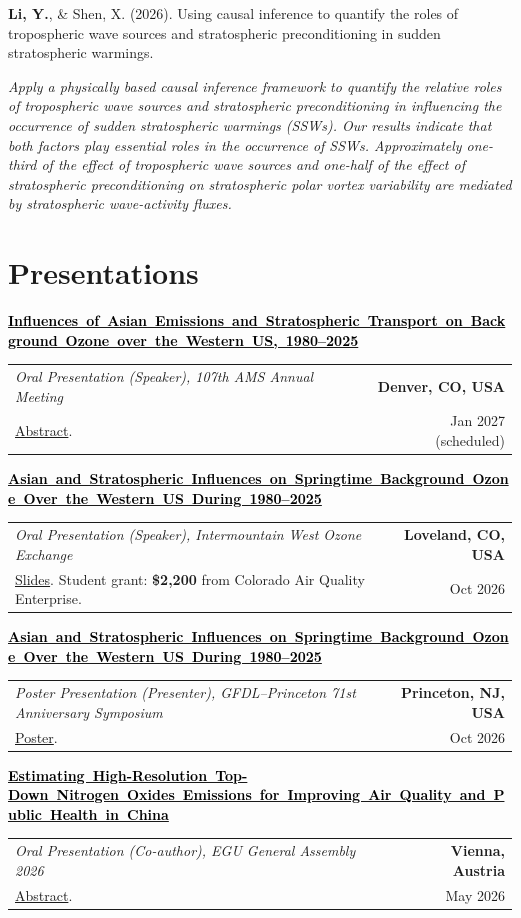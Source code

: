 \documentclass[11pt,a4paper]{article}
\makeatletter
\newcommand{\publication}[1]{%
  \Needspace{4\baselineskip}
  \par\noindent #1\par
}
\newcommand{\prestitle}[1]{\mbox{\fontsize{9.3}{11.5}\selectfont\textbf{#1}}}
\newcommand{\presentation}[5]{%
  \Needspace{4\baselineskip}
  \par\noindent\makebox[1.1em][l]{\textbullet}%
  \parbox[t]{\dimexpr\linewidth-1.1em\relax}{%
    \prestitle{#1}\par\vspace{1pt}%
    \begin{tabularx}{\linewidth}{@{}>{\raggedright\arraybackslash}X r@{}}
      \textit{#2} & \textbf{#3} \\
      #5 & #4
    \end{tabularx}}\par\vspace{3pt}
}
\newcommand{\researchsummary}[1]{%
  {\itshape #1\par}\vspace{4pt}
}
\makeatother
\begin{document}
\publication{\textbf{Li, Y.}, \& Shen, X. (2026). Using causal inference to quantify the roles of tropospheric wave sources and stratospheric preconditioning in sudden stratospheric warmings.}

\researchsummary{Apply a physically based causal inference framework to quantify the relative roles of tropospheric wave sources and stratospheric preconditioning in influencing the occurrence of sudden stratospheric warmings (SSWs). Our results indicate that both factors play essential roles in the occurrence of SSWs. Approximately one-third of the effect of tropospheric wave sources and one-half of the effect of stratospheric preconditioning on stratospheric polar vortex variability are mediated by stratospheric wave-activity fluxes.}

\section*{Presentations}

\presentation{\href{https://ams.confex.com/ams/107ANNUAL/meetingapp.cgi/Paper/487187}{\textcolor{black}{Influences of Asian Emissions and Stratospheric Transport on Background Ozone over the Western US, \mbox{1980--2025}}}}
  {Oral Presentation (Speaker), 107th AMS Annual Meeting}
  {Denver, CO, USA}
  {Jan 2027 (scheduled)}
  {\href{https://ams.confex.com/ams/107ANNUAL/meetingapp.cgi/Paper/487187}{Abstract}.}

\presentation{\href{https://ozoneexchange.org/conference-details/program/}{\textcolor{black}{Asian and Stratospheric Influences on Springtime Background Ozone Over the Western US During \mbox{1980--2025}}}}
  {Oral Presentation (Speaker), Intermountain West Ozone Exchange}
  {Loveland, CO, USA}
  {Oct 2026}
  {\href{https://ozoneexchange.org/wp-content/uploads/2026/10/S8.5-IMW_Ozone_Exchange_Session8_Yifan_Li_PU-1.pdf}{Slides}. Student grant: \textbf{\$2,200} from Colorado Air Quality Enterprise.}

\presentation{\href{https://www.gfdl.noaa.gov/gfdl-princeton-71st-anniversary-symposium/}{\textcolor{black}{Asian and Stratospheric Influences on Springtime Background Ozone Over the Western US During \mbox{1980--2025}}}}
  {Poster Presentation (Presenter), GFDL--Princeton 71st Anniversary Symposium}
  {Princeton, NJ, USA}
  {Oct 2026}
  {\href{https://yifanli24.github.io/assets/pdf/yifan-li-gfdl-princeton-2026-poster.pdf}{Poster}.}

\presentation{\href{https://meetingorganizer.copernicus.org/EGU26/EGU26-1055.html}{\textcolor{black}{Estimating High-Resolution Top-Down Nitrogen Oxides Emissions for Improving Air Quality and Public Health in China}}}
  {Oral Presentation (Co-author), EGU General Assembly 2026}
  {Vienna, Austria}
  {May 2026}
  {\href{https://doi.org/10.5194/egusphere-egu26-1055}{Abstract}.}
\end{document}
